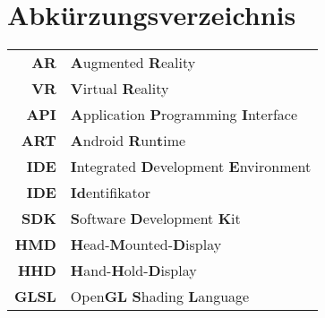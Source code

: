 \chapter{Abkürzungsverzeichnis}

\begin{center}
\begin{tabular}{rl}
\textbf{AR} & \textbf{A}ugmented \textbf{R}eality \\ 
\textbf{VR} & \textbf{V}irtual \textbf{R}eality \\ 
\textbf{API} & \textbf{A}pplication \textbf{P}rogramming \textbf{I}nterface \\ 
\textbf{ART} & \textbf{A}ndroid \textbf{R}un\textbf{t}ime \\
\textbf{IDE} & \textbf{I}ntegrated \textbf{D}evelopment \textbf{E}nvironment \\
\textbf{IDE} & \textbf{I}\textbf{d}entifikator \\
\textbf{SDK} & \textbf{S}oftware \textbf{D}evelopment \textbf{K}it \\
\textbf{HMD} & \textbf{H}ead-\textbf{M}ounted-\textbf{D}isplay \\
\textbf{HHD} & \textbf{H}and-\textbf{H}old-\textbf{D}isplay \\
\textbf{GLSL} & Open\textbf{GL} \textbf{S}hading \textbf{L}anguage \\
\end{tabular}
\end{center}
 